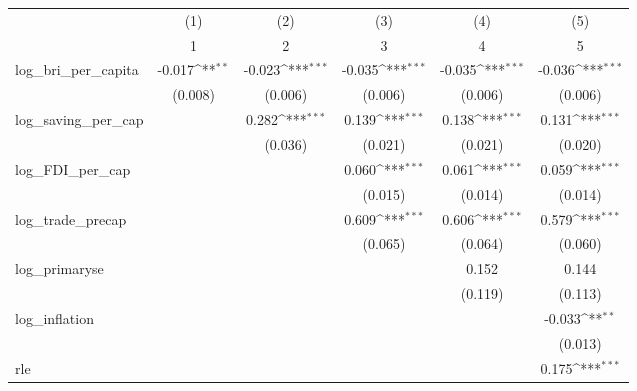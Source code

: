 {
\def\sym#1{\ifmmode^{#1}\else\(^{#1}\)\fi}
\begin{tabular}{l*{5}{c}}
\toprule
            &\multicolumn{1}{c}{(1)}&\multicolumn{1}{c}{(2)}&\multicolumn{1}{c}{(3)}&\multicolumn{1}{c}{(4)}&\multicolumn{1}{c}{(5)}\\
            &\multicolumn{1}{c}{1}&\multicolumn{1}{c}{2}&\multicolumn{1}{c}{3}&\multicolumn{1}{c}{4}&\multicolumn{1}{c}{5}\\
\midrule
log\_bri\_per\_capita&      -0.017\sym{**} &      -0.023\sym{***}&      -0.035\sym{***}&      -0.035\sym{***}&      -0.036\sym{***}\\
            &     (0.008)         &     (0.006)         &     (0.006)         &     (0.006)         &     (0.006)         \\
\addlinespace
log\_saving\_per\_cap&                     &       0.282\sym{***}&       0.139\sym{***}&       0.138\sym{***}&       0.131\sym{***}\\
            &                     &     (0.036)         &     (0.021)         &     (0.021)         &     (0.020)         \\
\addlinespace
log\_FDI\_per\_cap&                     &                     &       0.060\sym{***}&       0.061\sym{***}&       0.059\sym{***}\\
            &                     &                     &     (0.015)         &     (0.014)         &     (0.014)         \\
\addlinespace
log\_trade\_precap&                     &                     &       0.609\sym{***}&       0.606\sym{***}&       0.579\sym{***}\\
            &                     &                     &     (0.065)         &     (0.064)         &     (0.060)         \\
\addlinespace
log\_primaryse&                     &                     &                     &       0.152         &       0.144         \\
            &                     &                     &                     &     (0.119)         &     (0.113)         \\
\addlinespace
log\_inflation&                     &                     &                     &                     &      -0.033\sym{**} \\
            &                     &                     &                     &                     &     (0.013)         \\
\addlinespace
rle         &                     &                     &                     &                     &       0.175\sym{***}\\

\end{tabular}}
